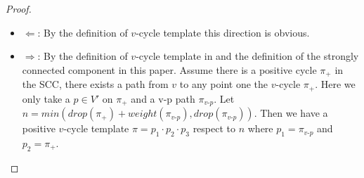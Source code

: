 \documentclass[12pt]{article}
\newtheorem{proof}{\textit{Proof}}
\begin{document}
\begin{proof}
\begin{itemize}
\item $\Leftarrow$: By the definition of $v$-cycle template this direction is obvious.                                                                                                                                                                                                                                                                                                                                                                                                                                                                        
                                                                                                                                                                                                                                                                                                                                                                                                                                                                                                                                                        
\item $\Rightarrow$:                                                                                                                                                                                                                                                                                                                                                                                                                                                                                                                                          
By the definition of $v$-cycle template in \cite{DBLP:conf/icalp/ChistikovH17} and the definition of the strongly connected component in this paper. Assume there is a positive cycle $\pi_+$ in the SCC, there exists a path from $v$ to any point one the $v$-cycle $\pi_+$. Here we only take a $p\in V'$ on $\pi_+$ and a v-p path $\pi_{v\text{-}p}$. Let $n = min(drop(\pi_+) + weight(\pi_{v\text{-}p}), drop(\pi_{v\text{-}p}))$. Then we have a positive $v$-cycle template $\pi = p_1\cdot p_2 \cdot p_3$ respect to $n$ where $p_1 = \pi_{v\text{-}p}$ and $p_2 = \pi_+$.

\end{itemize}
\end{proof}
\end{document}
